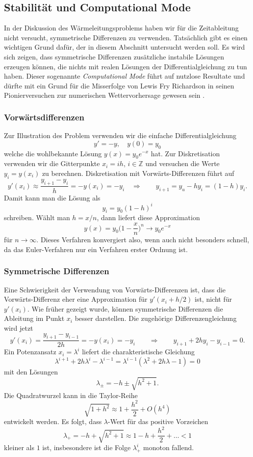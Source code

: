 %
%
%
\subsection{Stabilität und Computational Mode
\label{pde:subsection:stabilitaet}}
In der Diskussion des Wärmeleitungsproblems haben wir für die Zeitableitung
nicht versucht, symmetrische Differenzen zu verwenden.
Tatsächlich gibt es einen wichtigen Grund dafür, der in diesem Abschnitt
untersucht werden soll.
Es wird sich zeigen, dass symmetrische Differenzen zusätzliche instabile
Lösungen erzeugen können, die nichts mit realen Lösungen der
Differentialgleichung zu tun haben.
Dieser sogenannte {\em Computational Mode}
führt auf nutzlose Resultate und dürfte mit ein Grund für die Misserfolge
von Lewis Fry Richardson in seinen Pionierversuchen zur numerischen
Wettervorhersage gewesen sein
\cite{buch:richardson}.

\subsubsection{Vorwärtsdifferenzen}
Zur Illustration des Problem verwenden wir die einfache Differentialgleichung
\[
y' = -y,\quad y(0)=y_0
\]
welche die wohlbekannte Lösung $y(x)=y_0e^{-x}$ hat.
Zur Diskretisation verwenden wir die Gitterpunkte $x_i=ih$, $i\in\mathbb Z$
und versuchen die Werte $y_i = y(x_i)$ zu berechnen.
Diskretisation mit Vorwärts-Differenzen führt auf 
\[
y'(x_i) \approx \frac{y_{i+1}-y_i}{h} = -y(x_i) = -y_i
\quad\Rightarrow\qquad
y_{i+1} = y_u-hy_i = (1-h)y_i.
\]
Damit kann man die Lösung als 
\[
y_i = y_0(1-h)^i
\]
schreiben.
Wählt man $h=x/n$, dann liefert diese Approximation
\[
y(x) = y_0\biggl(1-\frac{x}n\biggr)^n 
\to
y_0e^{-x}
\]
für $n\to\infty$.
Dieses Verfahren konvergiert also, wenn auch nicht besonders schnell,
da das Euler-Verfahren nur ein Verfahren erster Ordnung ist.

\subsubsection{Symmetrische Differenzen}
Eine Schwierigkeit der Verwendung von Vorwärts-Differenzen ist, dass
die Vorwärts-Differenz eher eine Approximation für $y'(x_i+h/2)$ ist,
nicht für $y'(x_i)$.
Wie früher gezeigt wurde, können symmetrische Differenzen die Ableitung
im Punkt $x_i$ besser darstellen.
Die zugehörige Differenzengleichung wird jetzt
\[
y'(x_i)
=
\frac{y_{i+1}-y_{i-1}}{2h}
=
-y(x_i)
=
-y_i
\qquad\Rightarrow\qquad
y_{i+1}+2hy_i-y_{i-1}=0.
\]
Ein Potenzansatz $x_i=\lambda^i$ liefert die charakteristische Gleichung
\[
\lambda^{i+1} +2h\lambda^i -\lambda^{i-1}
=
\lambda^{i-1}(\lambda^2 + 2h\lambda -1)
=
0
\]
mit den Lösungen
\[
\lambda_\pm = -h \pm \sqrt{h^2+1}.
\]
Die Quadratwurzel kann in die Taylor-Reihe
\[
\sqrt{1+h^2}
\approx
1 + \frac{h^2}2 + O(h^4)
\]
entwickelt werden.
Es folgt, dass $\lambda$-Wert für das positive Vorzeichen
\[
\lambda_+
=
-h+\sqrt{h^2+1}
\approx
1-h+\frac{h^2}{2}+\dots
<
1
\]
kleiner als $1$ ist, insbesondere ist die Folge $\lambda_+^i$ monoton fallend.

